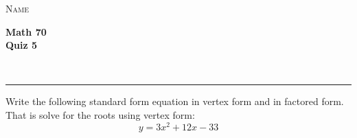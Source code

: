 \documentclass[11pt]{amsart}
\newcommand{\HRule}{\rule{\linewidth}{0.5mm}}
\begin{document}
\begin{minipage}{0.4\textwidth}
\begin{flushleft} \large
 \textsc{Name}
\end{flushleft}
\end{minipage}
\begin{minipage}{0.6\textwidth}
\begin{flushright} \Large
{\bf Math 70   \\
Quiz 5}
\end{flushright}
\end{minipage}\\

\HRule

Write the following standard form equation in vertex form and in factored form.   That is solve for the roots using vertex form: 
$$ y=3x^2+12x -33  $$
\end{document}

